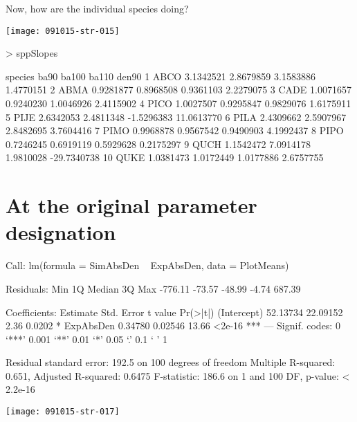\documentclass{article}
\begin{document}
Now, how are the individual species doing?

\texttt{[image: 091015-str-015]}
\begin{Schunk}
\begin{Sinput}
>   sppSlopes
\end{Sinput}
\begin{Soutput}
   species      ba90     ba100      ba110       den90
1     ABCO 3.1342521 2.8679859  3.1583886   1.4770151
2     ABMA 0.9281877 0.8968508  0.9361103   2.2279075
3     CADE 1.0071657 0.9240230  1.0046926   2.4115902
4     PICO 1.0027507 0.9295847  0.9829076   1.6175911
5     PIJE 2.6342053 2.4811348 -1.5296383  11.0613770
6     PILA 2.4309662 2.5907967  2.8482695   3.7604416
7     PIMO 0.9968878 0.9567542  0.9490903   4.1992437
8     PIPO 0.7246245 0.6919119  0.5929628   0.2175297
9     QUCH 1.1542472 7.0914178  1.9810028 -29.7340738
10    QUKE 1.0381473 1.0172449  1.0177886   2.6757755
\end{Soutput}
\end{Schunk}


\newpage
\section{At the original parameter designation}
\begin{Schunk}
\begin{Soutput}
Call:
lm(formula = SimAbsDen ~ ExpAbsDen, data = PlotMeans)

Residuals:
    Min      1Q  Median      3Q     Max 
-776.11  -73.57  -48.99   -4.74  687.39 

Coefficients:
            Estimate Std. Error t value Pr(>|t|)    
(Intercept) 52.13734   22.09152    2.36   0.0202 *  
ExpAbsDen    0.34780    0.02546   13.66   <2e-16 ***
---
Signif. codes:  0 ‘***’ 0.001 ‘**’ 0.01 ‘*’ 0.05 ‘.’ 0.1 ‘ ’ 1

Residual standard error: 192.5 on 100 degrees of freedom
Multiple R-squared:  0.651,	Adjusted R-squared:  0.6475 
F-statistic: 186.6 on 1 and 100 DF,  p-value: < 2.2e-16
\end{Soutput}
\end{Schunk}
\texttt{[image: 091015-str-017]}
\end{document}
